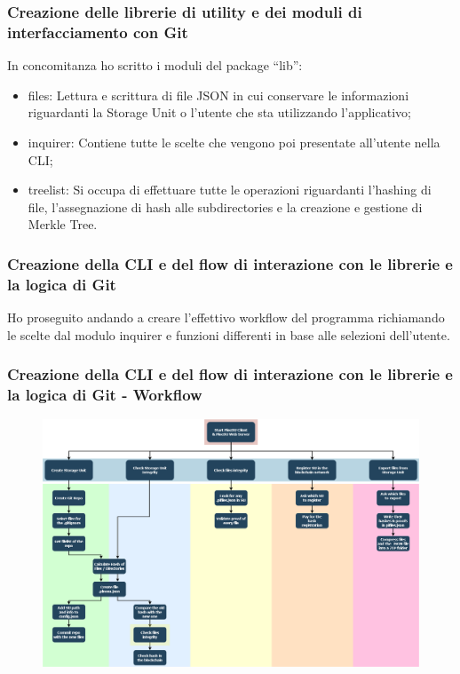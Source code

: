 \documentclass{beamer}
\begin{document}
\begin{frame}
	\frametitle{Creazione delle librerie di utility e dei moduli di interfacciamento con Git}
	In concomitanza ho scritto i moduli del package “lib”:
	\begin{itemize}
		\item files: Lettura e scrittura di file JSON in cui conservare le informazioni riguardanti la Storage Unit o l’utente che sta utilizzando l’applicativo;
		\item inquirer: Contiene tutte le scelte che vengono poi presentate all’utente nella CLI;
		\item treelist: Si occupa di effettuare tutte le operazioni riguardanti l’hashing di file, l’assegnazione di hash alle subdirectories e la creazione e gestione di Merkle Tree.
	\end{itemize}
\end{frame}
\begin{frame}
	\frametitle{Creazione della CLI e del flow di interazione con le librerie e la logica di Git}
	Ho proseguito andando a creare l’effettivo workflow del programma richiamando le scelte dal modulo inquirer e funzioni differenti in base alle selezioni dell’utente.	
\end{frame}
\begin{frame}
	\frametitle{Creazione della CLI e del flow di interazione con le librerie e la logica di Git - Workflow}
	\begin{figure}
		\includegraphics[width=1\textwidth]{figures/workflow.png}
	\end{figure}
\end{frame}
\end{document}
